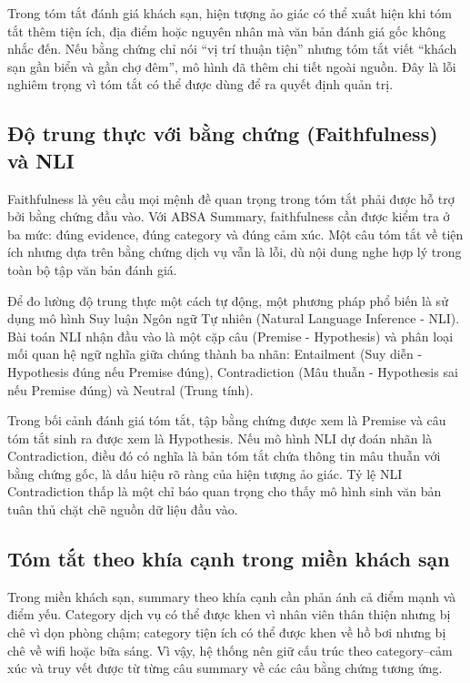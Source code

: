 Trong tóm tắt đánh giá khách sạn, hiện tượng ảo giác có thể xuất hiện khi tóm tắt thêm tiện ích, địa điểm hoặc nguyên nhân mà văn bản đánh giá gốc không nhắc đến. Nếu bằng chứng chỉ nói ``vị trí thuận tiện'' nhưng tóm tắt viết ``khách sạn gần biển và gần chợ đêm'', mô hình đã thêm chi tiết ngoài nguồn. Đây là lỗi nghiêm trọng vì tóm tắt có thể được dùng để ra quyết định quản trị.

\subsection{Độ trung thực với bằng chứng (Faithfulness) và NLI}
\label{subsec:dev-chap2-faithfulness}

Faithfulness là yêu cầu mọi mệnh đề quan trọng trong tóm tắt phải được hỗ trợ bởi bằng chứng đầu vào. Với ABSA Summary, faithfulness cần được kiểm tra ở ba mức: đúng evidence, đúng category và đúng cảm xúc. Một câu tóm tắt về tiện ích nhưng dựa trên bằng chứng dịch vụ vẫn là lỗi, dù nội dung nghe hợp lý trong toàn bộ tập văn bản đánh giá.

Để đo lường độ trung thực một cách tự động, một phương pháp phổ biến là sử dụng mô hình Suy luận Ngôn ngữ Tự nhiên (Natural Language Inference - NLI). Bài toán NLI nhận đầu vào là một cặp câu (Premise - Hypothesis) và phân loại mối quan hệ ngữ nghĩa giữa chúng thành ba nhãn: Entailment (Suy diễn - Hypothesis đúng nếu Premise đúng), Contradiction (Mâu thuẫn - Hypothesis sai nếu Premise đúng) và Neutral (Trung tính).

Trong bối cảnh đánh giá tóm tắt, tập bằng chứng được xem là Premise và câu tóm tắt sinh ra được xem là Hypothesis. Nếu mô hình NLI dự đoán nhãn là Contradiction, điều đó có nghĩa là bản tóm tắt chứa thông tin mâu thuẫn với bằng chứng gốc, là dấu hiệu rõ ràng của hiện tượng ảo giác. Tỷ lệ NLI Contradiction thấp là một chỉ báo quan trọng cho thấy mô hình sinh văn bản tuân thủ chặt chẽ nguồn dữ liệu đầu vào.

\subsection{Tóm tắt theo khía cạnh trong miền khách sạn}
\label{subsec:dev-chap2-hotel-aspect-summary}

Trong miền khách sạn, summary theo khía cạnh cần phản ánh cả điểm mạnh và điểm yếu. Category dịch vụ có thể được khen vì nhân viên thân thiện nhưng bị chê vì dọn phòng chậm; category tiện ích có thể được khen về hồ bơi nhưng bị chê về wifi hoặc bữa sáng. Vì vậy, hệ thống nên giữ cấu trúc theo category--cảm xúc và truy vết được từ từng câu summary về các câu bằng chứng tương ứng.

